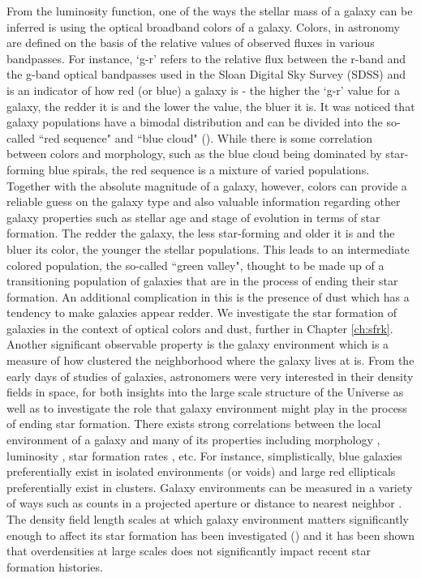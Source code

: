 From the luminosity function, one of the ways the stellar mass of a galaxy can be inferred is using the optical broadband colors of a galaxy. Colors, in astronomy are defined on the basis of the relative values of observed fluxes in various bandpasses. For instance, `g-r' refers to the relative flux between the r-band and the g-band optical bandpasses used in the Sloan Digital Sky Survey (SDSS) and is an indicator of how red (or blue) a galaxy is - the higher the `g-r' value for a galaxy, the redder it is and the lower the value, the bluer it is. It was noticed that galaxy populations have a bimodal distribution and can be divided into the so-called ``red sequence" and ``blue cloud" (\citet{2001AJ....122.1861S, 2003ApJ...594..186B}).  While there is some correlation between colors and morphology, such as the blue cloud being dominated by star-forming blue spirals, the red sequence is a mixture of varied populations.\\

Together with the absolute magnitude of a galaxy, however, colors can provide a reliable guess on the galaxy type and also valuable information regarding other galaxy properties such as stellar age and stage of evolution in terms of star formation. The redder the galaxy, the less star-forming and older it is and the bluer its color, the younger the stellar populations. This leads to an intermediate colored population, the so-called ``green valley", thought to be made up of a transitioning population of galaxies that are in the process of ending their star formation. An additional complication in this is the presence of dust which has a tendency to make galaxies appear redder. We investigate the star formation of galaxies in the context of optical colors and dust, further in Chapter \ref{ch:sfrk}.\\

Another significant observable property is the galaxy environment which is a measure of how clustered the neighborhood where the galaxy lives at is. From the early days of studies of galaxies, astronomers were very interested in their density fields in space, for both insights into the large scale structure of the Universe as well as to investigate the role that galaxy environment might play in the process of ending star formation. There exists strong correlations between the local environment of a galaxy and many of its properties including morphology \citep{dressler_galaxy_1980}, luminosity \citep{2002MNRAS.332..827N}, star formation rates \citep{2002MNRAS.334..673L}, etc. For instance, simplistically, blue galaxies preferentially exist in isolated environments (or voids) and large red ellipticals preferentially exist in clusters. Galaxy environments can be measured in a variety of ways such as counts in a projected aperture or distance to nearest neighbor \citep{cooper_measuring_2005}. The density field length scales at which galaxy environment matters significantly enough to affect its star formation has been investigated (\citet{kauffmann_environmental_2004, 2006ApJ...645..977B, 2007ApJ...658..898P}) and it has been shown that overdensities at large scales does not significantly impact recent star formation histories.\\
 
